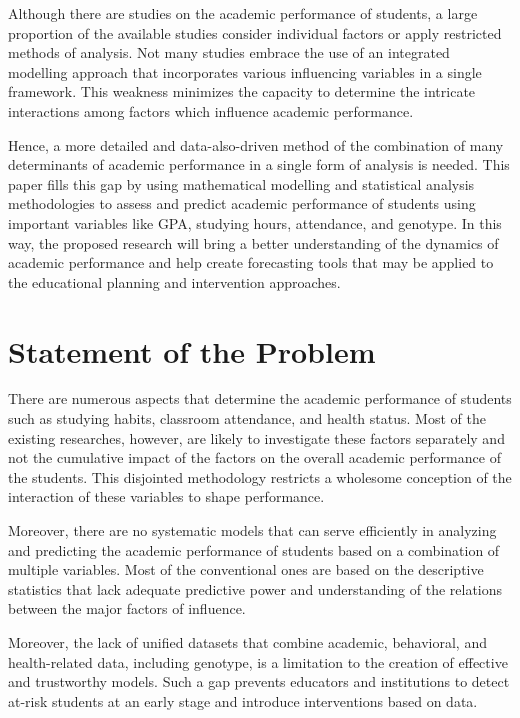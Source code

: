 \documentclass[12pt]{report}
\begin{document}
	Although there are studies on the academic performance of students, a large proportion of the available studies consider individual factors or apply restricted methods of analysis. Not many studies embrace the use of an integrated modelling approach that incorporates various influencing variables in a single framework. This weakness minimizes the capacity to determine the intricate interactions among factors which influence academic performance.
	
	Hence, a more detailed and data-also-driven method of the combination of many determinants of academic performance in a single form of analysis is needed. This paper fills this gap by using mathematical modelling and statistical analysis methodologies to assess and predict academic performance of students using important variables like GPA, studying hours, attendance, and genotype. In this way, the proposed research will bring a better understanding of the dynamics of academic performance and help create forecasting tools that may be applied to the educational planning and intervention approaches.
	
	
	
	\section{Statement of the Problem}
	
	There are numerous aspects that determine the academic performance of students such as studying habits, classroom attendance, and health status. Most of the existing researches, however, are likely to investigate these factors separately and not the cumulative impact of the factors on the overall academic performance of the students. This disjointed methodology restricts a wholesome conception of the interaction of these variables to shape performance.
	
	Moreover, there are no systematic models that can serve efficiently in analyzing and predicting the academic performance of students based on a combination of multiple variables. Most of the conventional ones are based on the descriptive statistics that lack adequate predictive power and understanding of the relations between the major factors of influence.
	
	Moreover, the lack of unified datasets that combine academic, behavioral, and health-related data, including genotype, is a limitation to the creation of effective and trustworthy models. Such a gap prevents educators and institutions to detect at-risk students at an early stage and introduce interventions based on data.
	
\end{document}
